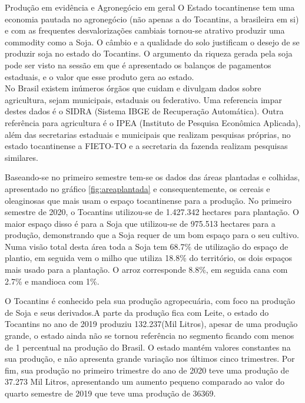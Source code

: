  \begin{smbox}[label={labelbox},nameref={Agricultura}]{Produção em evidência e Agronegócio em geral}
 	O Estado tocantinense tem uma economia pautada no agronegócio (não apenas a do Tocantins, a brasileira em si) e com as frequentes desvalorizações cambiais tornou-se atrativo produzir uma commodity como a Soja. O câmbio e a qualidade do solo justificam o desejo de se produzir soja no  estado do Tocantins. O argumento da riqueza gerada pela soja pode ser visto na sessão em que é apresentado os balanços de pagamentos estaduais, e o valor que esse produto gera ao estado.
\\
 No Brasil existem inúmeros órgãos que cuidam e divulgam dados sobre agricultura, sejam municipais, estaduais ou federativo. Uma referencia impar destes dados é o SIDRA (Sistema IBGE de Recuperação Automática). Outra referência para agricultura é o IPEA (Instituto de Pesquisa Econômica Aplicada), além das secretarias estaduais e municipais que realizam pesquisas próprias, no estado tocantinense a FIETO-TO e a secretaria da fazenda realizam pesquisas similares.
\end{smbox}

\par Baseando-se no primeiro semestre tem-se os dados das áreas plantadas e colhidas, apresentado no gráfico \ref{fig:areaplantada} e consequentemente, os cereais e oleaginosas que mais usam o espaço tocantinense para a produção. No primeiro semestre de 2020, o Tocantins utilizou-se de 1.427.342 hectares para plantação. O maior espaço disso é para a Soja que utilizou-se de 975.513 hectares para a produção, demonstrando que a Soja requer de um bom espaço para o seu cultivo. Numa visão total desta área toda a Soja tem 68.7\% de utilização do espaço de plantio, em seguida vem o milho que utiliza 18.8\% do território, os dois espaços mais usado para a plantação. O arroz corresponde 8.8\%, em seguida cana com 2.7\% e mandioca com 1\%.

\par O Tocantins é conhecido pela sua produção agropecuária, com foco na produção de Soja e seus derivados.A parte da produção fica com Leite, o estado do Tocantins no ano de 2019 produziu 132.237(Mil Litros), apesar de uma produção grande, o estado ainda não se tornou referência no segmento ficando com menos de 1 percentual na produção do Brasil. O estado mantém valores constantes na sua produção, e não apresenta grande variação nos últimos cinco trimestres. Por fim, sua produção no primeiro trimestre do ano de 2020 teve uma produção de 37.273 Mil Litros, apresentando um aumento pequeno comparado ao valor do quarto semestre de 2019 que teve uma produção de 36369. 


